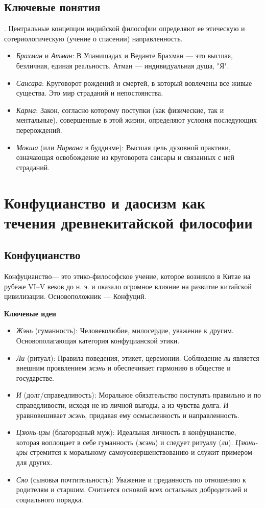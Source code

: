 \documentclass[12pt,a4paper]{article}
\begin{document}
	\subsection{Ключевые понятия}.
	Центральные концепции индийской философии определяют ее этическую и сотериологическую (учение о спасении) направленность.
	\begin{itemize}
		\item \textit{Брахман} и \textit{Атман}: В Упанишадах и Веданте Брахман --- это высшая, безличная, единая реальность.  Атман --- индивидуальная душа, "Я".
		\item \textit{Сансара}: Круговорот рождений и смертей, в который вовлечены все живые существа. Это мир страданий и непостоянства.
		\item \textit{Карма}: Закон, согласно которому поступки (как физические, так и ментальные), совершенные в этой жизни, определяют условия последующих перерождений.
		\item \textit{Мокша} (или \textit{Нирвана} в буддизме): Высшая цель духовной практики, означающая освобождение из круговорота сансары и связанных с ней страданий.
	\end{itemize}
	
	\section{Конфуцианство и даосизм как течения древнекитайской философии~\checkmark}
	
	\subsection{Конфуцианство} Конфуцианство--- это этико-философское учение, которое возникло в Китае на рубеже VI–V веков до н. э. и оказало огромное влияние на развитие китайской цивилизации. Основоположник --- Конфуций.
	
	\textbf{Ключевые идеи}
	\begin{itemize}
		\item \textit{Жэнь} (гуманность): Человеколюбие, милосердие, уважение к другим. Основополагающая категория конфуцианской этики.
		\item \textit{Ли} (ритуал): Правила поведения, этикет, церемонии. Соблюдение \textit{ли} является внешним проявлением \textit{жэнь} и обеспечивает гармонию в обществе и государстве.
		\item \textit{И} (долг/справедливость): Моральное обязательство поступать правильно и по справедливости, исходя не из личной выгоды, а из чувства долга. \textit{И} уравновешивает \textit{жэнь}, придавая ему осмысленность и направленность.
		\item \textit{Цзюнь-цзы} (благородный муж): Идеальная личность в конфуцианстве, которая воплощает в себе гуманность (\textit{жэнь}) и следует ритуалу (\textit{ли}). \textit{Цзюнь-цзы} стремится к моральному самоусовершенствованию и служит примером для других.
		\item \textit{Сяо} (сыновья почтительность): Уважение и преданность по отношению к родителям и старшим. Считается основой всех остальных добродетелей и социального порядка.
	\end{itemize}
	
\end{document}
